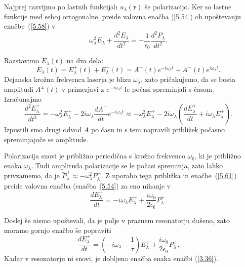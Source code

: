 Najprej razvijmo po lastnih funkcijah $u_{\lambda}(\mathbf{r})$ še polarizacijo. 
Ker so lastne funkcije med seboj ortogonalne, preide valovna enačba (\ref{5.54}) 
ob upoštevanju enačbe~(\ref{5.58}) v 
\begin{equation}  
\label{5.59}
\omega_{\lambda}^2 E_{\lambda}+\frac{d^2 E_\lambda}{dt^2}= 
-\frac{1}{\epsilon_0}\frac{d^2P_\lambda}{dt^2}.
\end{equation}

Razstavimo $E_{\lambda}(t)$ na dva dela: 
\begin{equation}  \label{5.60}
E_{\lambda}(t)=E_{\lambda}^+(t)+E_{\lambda}^-(t)=A^+(t)e^{-i
\omega_{\lambda}t}+A^-(t)e^{i \omega_{\lambda}t}.
\end{equation}
Dejanska krožna frekvenca laserja je blizu $\omega_{\lambda}$, zato pričakujemo,
da se bosta amplitudi $A^{\pm}(t)$ v primerjavi z $e^{-i \omega_{\lambda}t}$ le
počasi spreminjali s časom. Izračunajmo 
\begin{equation}  
\label{5.61}
\frac{d^2 E_\lambda^+}{dt^2}=-\omega_{\lambda}^2 E_{\lambda}^+ - 2i \omega_{\lambda} 
\frac{dA^+}{dt} e^{-i \omega_{\lambda}t} \approx 
-\omega_{\lambda}^2 E_{\lambda}^+-2i \omega_{\lambda}\left(\frac{dE_{\lambda}^+}{dt}+
i \omega_{\lambda}E_{\lambda}^+\right).
\end{equation}
Izpustili smo drugi odvod $A$ po času in s tem napravili približek počasno spreminjajoče se amplitude.

Polarizacija snovi je približno periodična s krožno frekvenco $\omega_0$, 
ki je približno enaka $\omega_\lambda$.
Tudi amplituda polarizacije se le počasi spreminja, zato lahko privzamemo, da je 
$\ddot{P}_{\lambda}^+ \approx - \omega_\lambda^2 P_{\lambda}^+$. Z uporabo tega
približka in enačbe~(\ref{5.61}) preide valovna enačba (enačba~\ref{5.54}) za eno nihanje v 
\begin{equation}  
\label{5.62}
\frac{dE_{\lambda}^+}{dt}=-i \omega_{\lambda} E_{\lambda}^++
\frac{i \omega_0}{2\epsilon_0}P_{\lambda}^+.
\end{equation}

Doslej še nismo upoštevali, da je polje v praznem resonatorju dušeno, zato
moramo gornjo enačbo še popraviti
\begin{equation}  
\label{5.63}
\frac{dE_{\lambda}^+}{dt}=\left(-i \omega_{\lambda}-\frac{1}{\tau}\right) E_{\lambda}^+ 
+\frac{i \omega_0}{2\epsilon_0}P_{\lambda}^+.
\end{equation}
Kadar v resonatorju ni snovi, je dobljena enačba enaka enačbi (\ref{3.36}).

